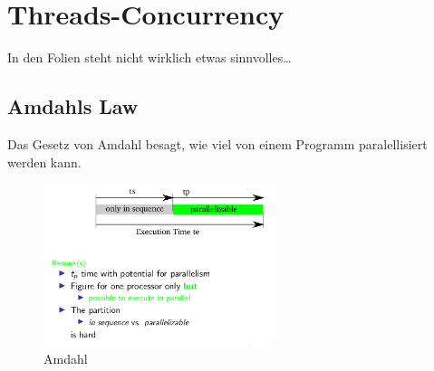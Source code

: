 \hypertarget{threads-concurrency}{%
\section{Threads-Concurrency}\label{threads-concurrency}}

In den Folien steht nicht wirklich etwas sinnvolles\ldots{}

\subsection{Amdahls Law}
Das Gesetz von Amdahl besagt, wie viel von einem Programm paralellisiert werden kann.
\begin{figure}[H]
\centering
\includegraphics[width=0.6\textwidth]{figures/amdahl.png}
\caption{Amdahl}
\end{figure}

\clearpage